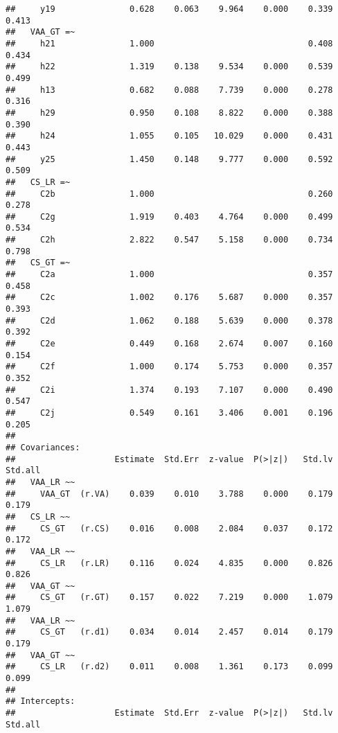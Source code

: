 \documentclass[
]{article}
\begin{document}
\begin{verbatim}
##     y19               0.628    0.063    9.964    0.000    0.339    0.413
##   VAA_GT =~                                                             
##     h21               1.000                               0.408    0.434
##     h22               1.319    0.138    9.534    0.000    0.539    0.499
##     h13               0.682    0.088    7.739    0.000    0.278    0.316
##     h29               0.950    0.108    8.822    0.000    0.388    0.390
##     h24               1.055    0.105   10.029    0.000    0.431    0.443
##     y25               1.450    0.148    9.777    0.000    0.592    0.509
##   CS_LR =~                                                              
##     C2b               1.000                               0.260    0.278
##     C2g               1.919    0.403    4.764    0.000    0.499    0.534
##     C2h               2.822    0.547    5.158    0.000    0.734    0.798
##   CS_GT =~                                                              
##     C2a               1.000                               0.357    0.458
##     C2c               1.002    0.176    5.687    0.000    0.357    0.393
##     C2d               1.062    0.188    5.639    0.000    0.378    0.392
##     C2e               0.449    0.168    2.674    0.007    0.160    0.154
##     C2f               1.000    0.174    5.753    0.000    0.357    0.352
##     C2i               1.374    0.193    7.107    0.000    0.490    0.547
##     C2j               0.549    0.161    3.406    0.001    0.196    0.205
## 
## Covariances:
##                    Estimate  Std.Err  z-value  P(>|z|)   Std.lv  Std.all
##   VAA_LR ~~                                                             
##     VAA_GT  (r.VA)    0.039    0.010    3.788    0.000    0.179    0.179
##   CS_LR ~~                                                              
##     CS_GT   (r.CS)    0.016    0.008    2.084    0.037    0.172    0.172
##   VAA_LR ~~                                                             
##     CS_LR   (r.LR)    0.116    0.024    4.835    0.000    0.826    0.826
##   VAA_GT ~~                                                             
##     CS_GT   (r.GT)    0.157    0.022    7.219    0.000    1.079    1.079
##   VAA_LR ~~                                                             
##     CS_GT   (r.d1)    0.034    0.014    2.457    0.014    0.179    0.179
##   VAA_GT ~~                                                             
##     CS_LR   (r.d2)    0.011    0.008    1.361    0.173    0.099    0.099
## 
## Intercepts:
##                    Estimate  Std.Err  z-value  P(>|z|)   Std.lv  Std.all

\end{verbatim}
\end{document}
